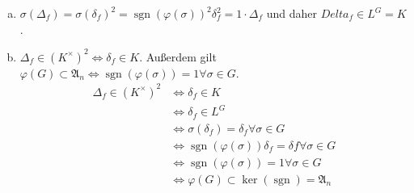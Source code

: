 \documentclass{article}
\begin{document}
\begin{enumerate}[(a)]
\begin{align*}
            &= (-1)^n \prod_{1 \leq i < j \leq n} (\alpha_i - \alpha_j)
            \intertext{Dann ist per Definition $\operatorname{sgn}(\varphi(\sigma)) = (-1)^n$}
            &= \operatorname{sgn}(\varphi(\sigma)) \delta_f.
        \end{align*}
        \item $\sigma(\Delta_f) = \sigma(\delta_f)^2 = \operatorname{sgn}(\varphi(\sigma))^2 \delta_f^2 = 1 \cdot \Delta_f$ und daher $Delta_f \in L^G = K$.
        \item $\Delta_f \in (K^\times)^2 \Leftrightarrow \delta_f \in K$. Außerdem gilt $\varphi(G) \subset \mathfrak{A}_n \Leftrightarrow \operatorname{sgn}(\varphi(\sigma)) = 1 \forall \sigma \in G $.
        \begin{align*}
            \Delta_f \in (K^\times)^2 &\Leftrightarrow \delta_f \in K\\
            &\Leftrightarrow \delta_f \in L^G\\
            &\Leftrightarrow \sigma(\delta_f) = \delta_f \forall \sigma \in G\\
            &\Leftrightarrow \operatorname{sgn}(\varphi(\sigma)) \delta_f = \delta f \forall \sigma \in G\\
            &\Leftrightarrow \operatorname{sgn}(\varphi(\sigma)) = 1 \forall \sigma \in G\\
            &\Leftrightarrow \varphi(G) \subset \ker(\operatorname{sgn}) = \mathfrak{A}_n
        \end{align*}
    \end{enumerate}
\end{document}
